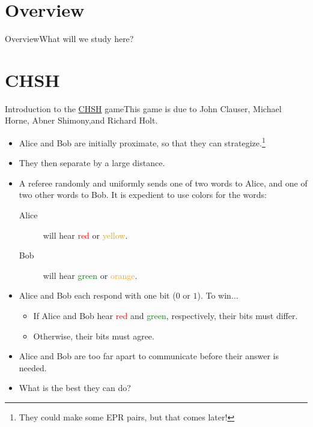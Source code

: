 
\section*{Overview}

\begin{frame}{Overview}{What will we study here?}
\end{frame}

\section*{CHSH}

{%
\def\Red{Red}\def\Yellow{Goldenrod}\def\Green{green}\def\Orange{orange}%
\def\RD#1{\textcolor{\Red}{#1}}
\def\YL#1{\textcolor{\Yellow}{#1}}
\def\GN#1{\textcolor{\Green}{#1}}
\def\OR#1{\textcolor{\Orange}{#1}}
\begin{frame}{Introduction to the \href{https://en.wikipedia.org/wiki/CHSH_game}{CHSH} game}{This game is due to John Clauser, Michael Horne, Abner Shimony,and Richard Holt.}
    \begin{itemize}[<+->]
        \item Alice and Bob are initially proximate, so that they can strategize.\footnote{They could make some EPR pairs, but that comes later!}
        \item They then separate by a large distance.
        \item A referee randomly and uniformly sends one of two words to Alice, and one of two other words to Bob.  It is expedient to use colors for the words:
        \begin{description}
            \item[Alice] will hear \RD{red} or \YL{yellow}.
            \item[Bob] will hear \GN{green} or \OR{orange}.
        \end{description}
    \item Alice and Bob each respond with one bit ($0$ or $1$).  To win$\ldots$
    \begin{itemize}
        \item If Alice and Bob hear \RD{red} and \GN{green}, respectively, their bits must differ.
        \item Otherwise, their bits must agree.
    \end{itemize}
    \item Alice and Bob are too far apart to communicate before their answer is needed.
    \item What is the best they can do?
    \end{itemize}
\end{frame}%

}
